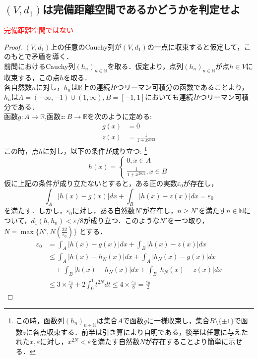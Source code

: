 \documentclass{jreport}
\newcommand{\R}{\mathbb{R}}
\begin{document}
\subsection{$(V,d_1)$は完備距離空間であるかどうかを判定せよ}
\textcolor{red}{完備距離空間ではない}
\begin{proof}
$(V,d_1)$上の任意のCauchy列が$(V,d_1)$の一点に収束すると仮定して，このもとで矛盾を導く．\\
前問におけるCauchy列$(h_n)_{n \in \mathbb{N}}$を取る．仮定より，点列$(h_n)_{n \in \mathbb{N}}$が点$h \in V$に収束する，この点$h$を取る．\\
	各自然数$n$に対し，$h_n$は$\R$上の連続かつリーマン可積分の函数であることより，$h_n$は$A=(-\infty,-1)\cup (1,\infty),B=[-1,1]$においても連続かつリーマン可積分である．\\
函数$g: A \to \R$,函数$z: B \to \R$を次のように定める:\\
\begin{align}
	g(x) &=0\\
	z(x) &=\frac{1}{1+x^{2022}}
\end{align}
この時，点$h$に対し，以下の条件が成り立つ:
	\footnote{	この時，函数列$(h_n)_{n\in \mathbb{N}}$は集合$A$で函数$g$に一様収束し，集合$B\setminus\{\pm 1\}$で函数$z$に各点収束する．前半は引き算により自明である，後半は任意に与えたれた$x,\varepsilon$に対し，$x^{2N}<\varepsilon $を満たす自然数$N$が存在することより簡単に示せる．} \\
$$
h(x) = 
\begin{cases}
	0,x\in A\\
	\frac{1}{1+x^{2022}} ,x \in B
\end{cases}
$$
仮に上記の条件が成り立たないとすると，ある正の実数$\varepsilon_0$が存在し，
$$
\int_A | h(x) -g(x)|dx + \int_B |h(x) -z(x)|dx = \varepsilon_0 
$$
を満たす．しかし，$\varepsilon_0$に対し，ある自然数$N'$が存在し，$n\ge N'$を満たす$n\in\mathbb{N}$について，$d_1(h,h_n)<\varepsilon/8$が成り立つ．このような$N'$を一つ取り，$N = \max \{ N',N(\frac{32}{\varepsilon_0}) \}$
とする．\\
$$
\begin{aligned}
	\varepsilon_0&= \int_A | h(x) -g(x)|dx + \int_B |h(x) -z(x)|dx\\
	&\le \int_A |h(x) - h_N(x)|dx + \int_A | h_N(x) -g(x)|dx \\
	& \quad+\int_B|h(x)-h_N(x)|dx + \int_B|h_N(x)-z(x)|dx\\
						       &\le 3 \times \frac{\varepsilon_0}{8} + 2\int_0^1 t^{2N}dt \le 4\times \frac{\varepsilon_0}{8} =\frac{\varepsilon_0}{2}
\end{aligned}
$$
\end{proof}
\end{document}
